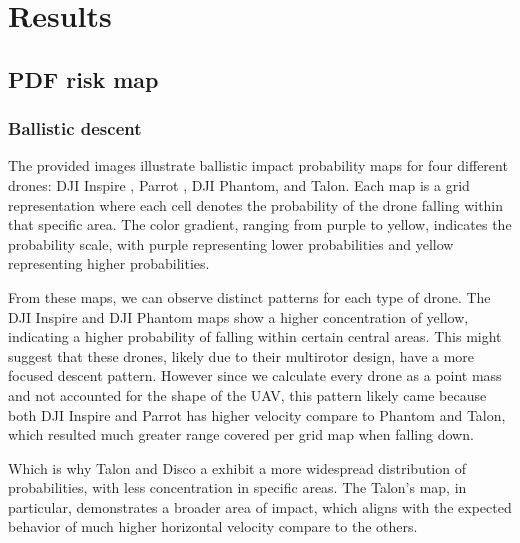 \documentclass[12pt]{report}
\begin{document}
\chapter{Results}

    \section{PDF risk map}
        \subsection{Ballistic descent}
        The provided images illustrate ballistic impact probability maps for four different drones: DJI Inspire , Parrot
       , DJI Phantom, and Talon. Each map is a grid representation where each cell denotes the probability of the drone
       falling within that specific area. The color gradient, ranging from purple to yellow, indicates the probability
       scale, with purple representing lower probabilities and yellow representing higher probabilities.
            
        From these maps, we can observe distinct patterns for each type of drone. The DJI Inspire and DJI Phantom maps
        show a higher concentration of yellow, indicating a higher probability of falling within certain central areas.
        This might suggest that these drones, likely due to their multirotor design, have a more focused descent
        pattern. However since we calculate every drone as a point mass and not accounted for the shape of the UAV, this
        pattern likely came because both DJI Inspire and Parrot has higher velocity compare to Phantom and Talon, which
        resulted much greater range covered per grid map when falling down.
        
        Which is why Talon and Disco a exhibit a more widespread distribution of probabilities, with less concentration
        in specific areas. The Talon's map, in particular, demonstrates a broader area of impact, which aligns with the
        expected behavior of much higher horizontal velocity compare to the others.
\end{document}
